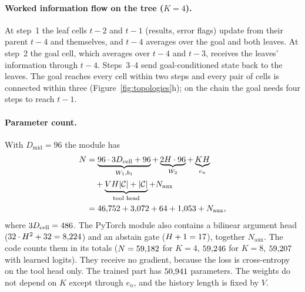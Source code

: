 \documentclass[10pt,twocolumn,letterpaper]{article}
\begin{document}
\paragraph{Worked information flow on the tree ($K{=}4$).} At step~1 the leaf cells $t{-}2$ and $t{-}1$ (results, error flags) update from their parent $t{-}4$ and themselves, and $t{-}4$ averages over the goal and both leaves. At step~2 the goal cell, which averages over $t{-}4$ and $t{-}3$, receives the leaves' information through $t{-}4$. Steps~3--4 send goal-conditioned state back to the leaves. The goal reaches every cell within two steps and every pair of cells is connected within three (Figure~\ref{fig:topologies}h); on the chain the goal needs four steps to reach $t{-}1$.

\paragraph{Parameter count.} With $D_{\text{mid}}{=}96$ the module has
\begin{equation}\label{eq:params}
\begin{aligned}
N &= \underbrace{96\cdot 3D_{\text{cell}} + 96}_{W_1,b_1} + \underbrace{2H\cdot 96}_{W_2} + \underbrace{KH}_{e_n} \\ &\quad + \underbrace{VH|\mathcal{C}| + |\mathcal{C}|}_{\text{tool head}} + N_{\text{aux}} \\
&= 46{,}752 + 3{,}072 + 64 + 1{,}053 + N_{\text{aux}} ,
\end{aligned}
\end{equation}
where $3D_{\text{cell}} = 486$. The PyTorch module also contains a bilinear argument head ($32\cdot H^2 + 32 = 8{,}224$) and an abstain gate ($H+1 = 17$), together $N_{\text{aux}}$. The code counts them in its totals ($N = 59{,}182$ for $K{=}4$, $59{,}246$ for $K{=}8$, $59{,}207$ with learned logits). They receive no gradient, because the loss is cross-entropy on the tool head only. The trained part has $50{,}941$ parameters. The weights do not depend on $K$ except through $e_n$, and the history length is fixed by $V$.
\end{document}
